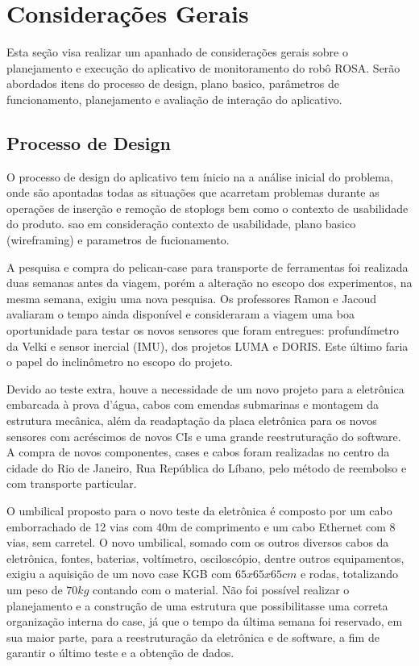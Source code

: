 \section{Considerações Gerais}
Esta seção visa realizar um apanhado de considerações gerais sobre o
planejamento e execução do aplicativo de monitoramento do robô ROSA. Serão
abordados itens do processo de design, plano basico,
parâmetros de funcionamento, planejamento e avaliação de interação do
aplicativo.

\subsection{Processo de Design}
O processo de design do aplicativo tem ínicio na a análise inicial do
problema, onde são apontadas todas as situações que acarretam pro\-ble\-mas
durante as opera\-ções de inserção e remoção de stoplogs bem como o contexto de
usabilidade do produto. sao em consideração
contexto de usabilidade, plano basico (wireframing) e parametros de fucionamento.



A pesquisa e compra do pelican-case para transporte de ferramentas foi
realizada duas semanas antes da viagem, porém a alteração no escopo dos experimentos, na mesma
semana, exigiu uma nova pesquisa. Os professores Ramon e Jacoud avaliaram o
tempo ainda disponível e consideraram a viagem uma boa oportunidade para testar
os novos sensores que foram entregues:
profundímetro da Velki e sensor inercial (IMU), dos projetos LUMA e DORIS. Este
último faria o papel do inclinômetro no escopo do projeto. 

Devido ao teste extra, houve a necessidade de um novo projeto para a eletrônica
embarcada à prova d'água, cabos com emendas submarinas e montagem da estrutura mecânica, além da readaptação da placa eletrônica para os novos sensores com acréscimos de novos
CIs e uma grande reestruturação do software. A compra de novos componentes,
cases e cabos foram realizadas no centro da cidade do Rio de Janeiro, Rua
República do Líbano, pelo método de reembolso e com transporte particular.

O umbilical proposto para o novo teste da eletrônica é composto por um cabo
emborrachado de 12 vias com 40m de comprimento e um cabo Ethernet com 8 vias,
sem carretel.
O novo umbilical, somado com os outros diversos cabos da eletrônica, fontes,
baterias, voltímetro, osciloscópio, dentre outros equipamentos, exigiu a
aquisição de um novo case KGB com $65x65x65cm$ e rodas, totalizando um peso de
$70kg$ contando com o material.
Não foi possível realizar o planejamento e a construção de uma estrutura que
possibilitasse uma correta organização interna do case, já que o tempo da
última semana foi reservado, em sua maior parte, para a reestruturação da eletrônica e de software, a fim de garantir o último teste e a obtenção de dados.

